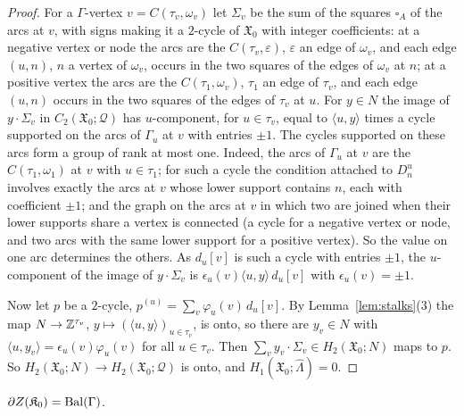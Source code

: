 \begin{proof}
For a $\Gamma$-vertex $v=C(\tau_v,\omega_v)$ let $\Sigma_v$ be the sum of the squares $\square_A$ of the arcs at $v$, with signs
making it a $2$-cycle of $\mathfrak X_0$ with integer coefficients: at a negative vertex or node the arcs are the $C(\tau_v,\varepsilon)$,
$\varepsilon$ an edge of $\omega_v$, and each edge $(u,n)$, $n$ a vertex of $\omega_v$, occurs in the two squares of the edges of
$\omega_v$ at $n$; at a positive vertex the arcs are the $C(\tau_1,\omega_v)$, $\tau_1$ an edge of $\tau_v$, and each edge
$(u,n)$ occurs in the two squares of the edges of $\tau_v$ at $u$. For $y\in N$ the image of $y\cdot\Sigma_v$ in
$C_2(\mathfrak X_0;\mathcal Q)$ has $u$-component, for $u\in\tau_v$, equal to $\langle u,y\rangle$ times a cycle supported on the arcs of
$\Gamma_u$ at $v$ with entries $\pm1$. The cycles supported on these arcs form a group of rank at most one. Indeed, the arcs of
$\Gamma_u$ at $v$ are the $C(\tau_1,\omega_1)$ at $v$ with $u\in\tau_1$; for such a cycle the condition attached to $D^u_n$
involves exactly the arcs at $v$ whose lower support contains $n$, each with coefficient $\pm1$; and the graph on the arcs at
$v$ in which two are joined when their lower supports share a vertex is connected (a cycle for a negative vertex or node, and
two arcs with the same lower support for a positive vertex). So the value on one arc determines the others. As $d_u[v]$ is such a cycle with entries $\pm1$, the $u$-component of the
image of $y\cdot\Sigma_v$ is $\epsilon_u(v)\langle u,y\rangle\,d_u[v]$ with $\epsilon_u(v)=\pm1$.

Now let $p$ be a $2$-cycle, $p^{(u)}=\sum_v\varphi_u(v)\,d_u[v]$. By Lemma~\ref{lem:stalks}(3) the map $N\to\mathbb Z^{\tau_v}$,
$y\mapsto(\langle u,y\rangle)_{u\in\tau_v}$, is onto, so there are $y_v\in N$ with $\langle u,y_v\rangle=\epsilon_u(v)\varphi_u(v)$ for
all $u\in\tau_v$. Then $\sum_vy_v\cdot\Sigma_v\in H_2(\mathfrak X_0;N)$ maps to $p$. So $H_2(\mathfrak X_0;N)\to H_2(\mathfrak X_0;\mathcal Q)$ is onto, and
$H_1(\mathfrak X_0;\hat\Lambda)=0$.
\end{proof}

\begin{theorem}[filling]\label{thm:filling}
$\partial Z(\mathfrak K_0)=\mathrm{Bal}(\Gamma)$.
\end{theorem}

